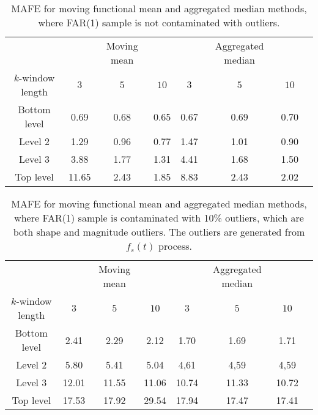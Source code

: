 \documentclass[12pt,a4paper]{article}
\numberwithin{equation}{section}
\begin{document}
\begin{table}
\caption{MAFE for moving functional mean and aggregated median methods, where FAR(1) sample is not contaminated with outliers.}
\label{tab:far} 
\begin{center}
\begin{small}
\begin{tabular}{c|ccc|cccc}\hline
\noalign{\smallskip}
 & &Moving mean&  &  &Aggregated median&  \\
	$k$-window length& $3$ & $5$ & $10$ & $3$ &$5$ & $10$ \\\hline
	Bottom level & 0.69 & 0.68 &0.65&0.67 & 0.69&0.70\\
	Level 2 &1.29& 0.96 &0.77 & 1.47 & 1.01 & 0.90  \\
	Level 3 &3.88  &1.77&1.31 & 4.41 & 1.68 & 1.50 \\
    Top level & 11.65 & 2.43 & 1.85& 8.83 & 2.43 & 2.02   \\
\hline	
\end{tabular}
\end{small}
\end{center}
\end{table}
\begin{table}
\caption{MAFE for moving functional mean and aggregated median methods, where FAR(1) sample is contaminated with 10\% outliers, which are both shape and magnitude outliers. The outliers are generated from $f_s(t)$ process.}
\label{tab:out10} 
\begin{center}
\begin{small}
\begin{tabular}{c|ccc|cccc}\hline
\noalign{\smallskip}
 & &Moving mean&  &  &Aggregated median&  \\
	$k$-window length& $3$ & $5$ & $10$ & $3$ &$5$ & $10$ \\\hline
	Bottom level & 2.41 & 2.29 &2.12&1.70 &1.69&1.71\\
	Level 2 &5.80&  5.41 &5.04 & 4,61& 4,59&4,59   \\
	Level 3 &12.01  &11.55& 11.06 & 10.74&  11.33&10.72  \\
    Top level & 17.53 & 17.92 & 29.54 & 17.94& 17.47 &17.41   \\
\hline	
\end{tabular}
\end{small}
\end{center}
\end{table}
\end{document}
